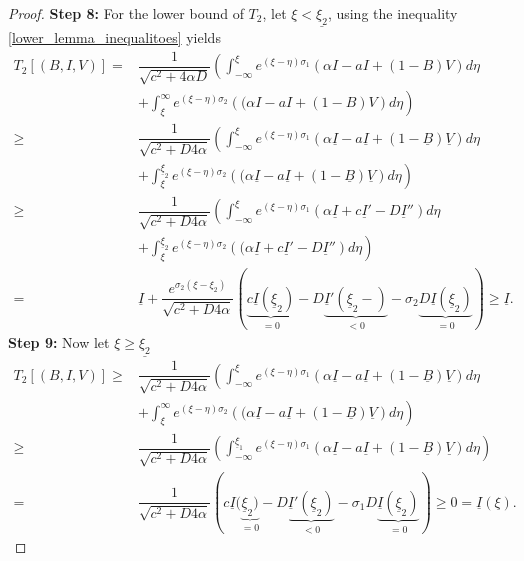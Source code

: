 \documentclass[11pt]{article}
\theoremstyle{definition}
\begin{document}
{\begin{proof}
\noindent\textbf{Step 8:} For the lower bound of $T_2$, let $\xi < \underline{\xi_2}$, using the inequality \eqref{lower_lemma_inequalitoes} yields
\begin{align}
        T_2[(B,I,V)] = &\dfrac{1}{\sqrt{c^2+4 \alpha D}} \left( \int_{-\infty}^{\xi} e^{(\xi- \eta)\sigma_1} {\left(\alpha I-aI+(1-{B})V \right)}d \eta \right. \\ & \left.+  \int_{\xi}^{\infty} e^{(\xi- \eta)\sigma_2} {\left((\alpha I-aI+(1-{B})V \right)}d \eta \right)\\ 
      \geq& \dfrac{1}{\sqrt{c^2+D4 \alpha}} \left( \int_{-\infty}^{\xi} e^{(\xi- \eta)\sigma_1} {\left(\alpha \underline{I}-a\underline{I}+(1-\underline{B})\underline{V} \right)}d \eta \right. \\ &\left.+  \int_{\xi}^{\underline{\xi}_2} e^{(\xi- \eta)\sigma_2} {\left((\alpha \underline{I}-a\underline{I}+(1-\underline{B})\underline{V}\right)}d \eta \right)\\ 
      \geq &\dfrac{1}{\sqrt{c^2+D4 \alpha}} \left( \int_{-\infty}^{\xi} e^{(\xi- \eta)\sigma_1} {\left(\alpha \underline{I}+c\underline{I}'-D\underline{I}'' \right)}d \eta \right. \\ &\left. +  \int_{\xi}^{\underline{\xi}_2} e^{(\xi- \eta)\sigma_2} {\left((\alpha \underline{I}+c\underline{I}'-D\underline{I}''\right)}d \eta \right)  \\  =& \underline{I}+ \dfrac{e^{\sigma_2(\xi-\xi_2)}}{\sqrt{c^2+D4 \alpha}}\left(\underbrace{c\underline{I}(\underline{\xi}_2)}_{=0}-D \underbrace{\underline{I}'(\underline{\xi}_2-)}_{<0} - \sigma_2 \underbrace {D {\underline{I}(\underline{\xi}_2)}}_{=0} \right) \ge \underline{I}.
    \end{align}
\textbf{Step 9: }Now let $\xi \ge \underline{\xi_2}$ \begin{align}
      T_2[(B,I,V)] \geq& \dfrac{1}{\sqrt{c^2+D4 \alpha}} \left( \int_{-\infty}^{\xi} e^{(\xi- \eta)\sigma_1} {\left(\alpha \underline{I}-a\underline{I}+(1-\underline{B})\underline{V} \right)}d \eta \right. \\ & \left.+  \int_{\xi}^{\infty} e^{(\xi- \eta)\sigma_2} {\left((\alpha \underline{I}-a\underline{I}+(1-\underline{B})\underline{V}\right)}d \eta \right)\\ \geq&\dfrac{1}{\sqrt{c^2+D4 \alpha}} \left( \int_{-\infty}^{\underline{\xi}_1} e^{(\xi- \eta)\sigma_1} {\left(\alpha \underline{I}-a\underline{I}+(1-\underline{B})\underline{V} \right)}d \eta \right)\\ =& \dfrac{1}{\sqrt{c^2+D4 \alpha}}\left(c \underline{I}(\underbrace{\underline{\xi}_2)}_{=0}- D \underbrace{\underline{I}'(\underline{\xi}_2)}_{<0}-\sigma_1D\underbrace{\underline{I}(\underline{\xi}_2)}_{=0}\right) \geq 0 = \underline{I}(\xi).

\end{align}
\end{proof}}
\end{document}
